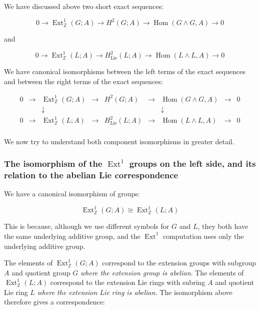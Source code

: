 We have discussed above two short exact sequences:

\begin{equation*}
  0 \to \operatorname{Ext}^1_{\mathbb{Z}}(G;A) \to H^2(G;A) \to \operatorname{Hom}(G \wedge G,A) \to 0
\end{equation*}

and

\begin{equation*}
0 \to \operatorname{Ext}^1_{\mathbb{Z}}(L;A) \to H^2_{\text{Lie}}(L;A) \to \operatorname{Hom}(L \wedge L, A) \to 0
\end{equation*}

We have canonical isomorphisms between the left terms of the exact
sequences and between the right terms of the exact sequences:

$$\begin{array}{ccccccccc}
  0 &\to &\operatorname{Ext}^1_{\mathbb{Z}}(G;A) &\to &H^2(G;A) &\to &\operatorname{Hom}(G \wedge G,A) &\to &0\\
  & & \downarrow & & & & \downarrow & & \\
  0 &\to &\operatorname{Ext}^1_{\mathbb{Z}}(L;A) & \to & H^2_{\text{Lie}}(L;A) & \to & \operatorname{Hom}(L \wedge L, A) & \to & 0\\
\end{array}$$

We now try to understand both component isomorphisms in greater
detail.

\subsubsection{The isomorphism of the $\operatorname{Ext}^1$ groups on the left side, and its relation to the abelian Lie correspondence}

We have a canonical isomorphism of groups:

$$\operatorname{Ext}^1_{\mathbb{Z}}(G;A) \cong \operatorname{Ext}^1_{\mathbb{Z}}(L;A)$$

This is because, although we use different symbols for $G$ and $L$,
they both have the same underlying additive group, and the
$\operatorname{Ext}^1$ computation uses only the underlying additive
group.

The elements of $\operatorname{Ext}^1_{\mathbb{Z}}(G;A)$ correspond to
the extension groups with subgroup $A$ and quotient group $G$ {\em
  where the extension group is abelian}. The elements of
$\operatorname{Ext}^1_{\mathbb{Z}}(L;A)$ correspond to the extension
Lie rings with subring $A$ and quotient Lie ring $L$ {\em where the
  extension Lie ring is abelian}. The isomorphism above therefore
gives a correspondence:

